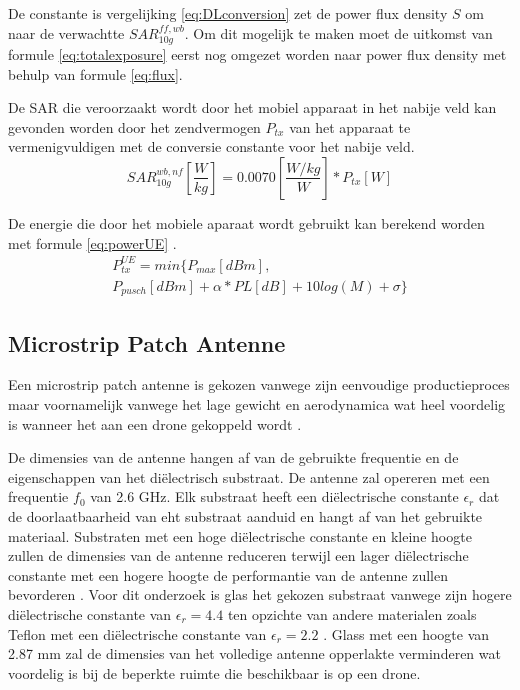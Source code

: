 \documentclass[twocolumn]{phdsymp} %
\begin{document}
De constante is vergelijking \ref{eq:DLconversion} zet de \gls{power flux density} $S$ om  naar de verwachtte $SAR^{ff,wb}_{10g}$.
Om dit mogelijk te maken moet 
de uitkomst van formule \ref{eq:totalexposure} eerst nog omgezet worden naar \gls{power flux density} met behulp van formule
\ref{eq:flux}.

De \gls{SAR} die veroorzaakt wordt door het mobiel apparaat in het nabije veld kan gevonden worden door 
het zendvermogen $P_{tx}$ van het  apparaat te vermenigvuldigen met de conversie constante voor het nabije veld.
\begin{equation} 
SAR^{wb,nf}_{10g} \left[\frac{W}{kg}\right] = 0.0070 \left[\frac{W/kg}{W}\right] * P_{tx} [W]
\label{eq:ulToSar}
\end{equation}

De energie die door het mobiele aparaat wordt gebruikt kan berekend worden met formule \ref{eq:powerUE} \cite{J22_plets2015joint}.
\begin{multline} 
P_{tx}^{UE} = min \big\{P_{max} [dBm] , \\
 P_{pusch} [dBm] + \alpha * PL [dB] + 10log(M) + \sigma \big\}
\label{eq:powerUE}
\end{multline}

\subsection{Microstrip Patch Antenne}
Een microstrip patch antenne is gekozen vanwege zijn eenvoudige productieproces maar voornamelijk vanwege het
 lage gewicht en aerodynamica wat heel voordelig is wanneer het aan een drone gekoppeld wordt \cite{J13_microstripadvantages}.

De dimensies van de antenne hangen af van de gebruikte frequentie en de eigenschappen van het di\"electrisch substraat.
De antenne zal opereren met een frequentie $f_0$ van 2.6 GHz. 
Elk substraat heeft een di\"electrische constante $\epsilon_r$ dat de doorlaatbaarheid 
van eht substraat aanduid en hangt af van het gebruikte materiaal.
Substraten met een hoge di\"electrische constante en kleine hoogte zullen de dimensies van de antenne reduceren 
terwijl  een lager di\"electrische constante met een hogere hoogte de performantie van de 
antenne zullen bevorderen \cite{J14_antennadesign,J15_antennadesign}. 
Voor dit onderzoek is glas het gekozen substraat vanwege zijn hogere di\"electrische constante
van $\epsilon_r = 4.4$ ten opzichte van andere materialen zoals Teflon met een di\"electrische constante
van $\epsilon_r = 2.2$ \cite{J14_antennadesign}. 
Glass met een hoogte van 2.87 mm 
zal de dimensies van het volledige antenne opperlakte verminderen wat 
voordelig is bij de beperkte ruimte die beschikbaar is op een drone.
\end{document}
